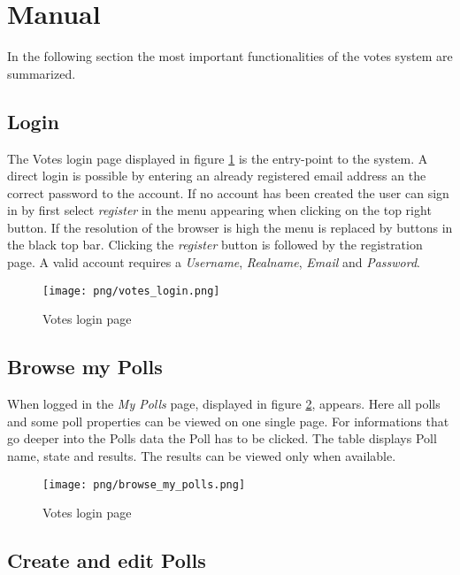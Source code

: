 \section{Manual}
In the following section the most important functionalities of the votes system are summarized.

\subsection{Login}

The Votes login page displayed in figure \ref{F:votes_login} is the entry-point to the system. A direct login is possible by entering an already registered email address an the correct password to the account. If no account has been created the user can sign in by first select \textit{register} in the menu appearing when clicking on the top right button. If the resolution of the browser is high the menu is replaced by buttons in the black top bar. Clicking the \textit{register} button is followed by the registration page. A valid account requires a \textit{Username}, \textit{Realname}, \textit{Email} and \textit{Password}.

\begin{figure}
\centering
\texttt{[image: png/votes\_login.png]}
\caption{Votes login page}
\label{F:votes_login}
\end{figure}

\subsection{Browse my Polls}
When logged in the \textit{My Polls} page, displayed in figure \ref{F:browse_my_polls}, appears. Here all polls and some poll properties can be viewed on one single page. For informations that go deeper into the Polls data the Poll has to be clicked. The table displays Poll name, state and results. The results can be viewed only when available.

\begin{figure}
\centering
\texttt{[image: png/browse\_my\_polls.png]}
\caption{Votes login page}
\label{F:browse_my_polls}
\end{figure}



\subsection{Create and edit Polls}
